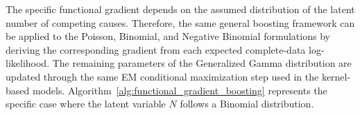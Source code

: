 The specific functional gradient depends on the assumed distribution of the latent
number of competing causes. Therefore, the same general boosting framework can be
applied to the Poisson, Binomial, and Negative Binomial formulations
by deriving the corresponding gradient from each expected complete-data
log-likelihood. The remaining parameters of the Generalized Gamma distribution are
updated through the same EM conditional maximization step used in the kernel-based
models. Algorithm~\ref{alg:functional_gradient_boosting} represents the specific
case where the latent variable $N$ follows a Binomial distribution.
